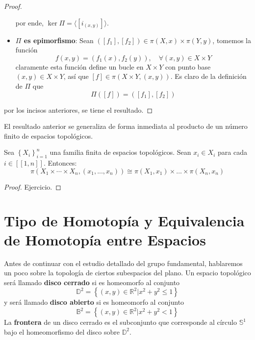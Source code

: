 \documentclass[12pt]{report}
\theoremstyle{largebreak}
\newcommand\natint[1]{\ensuremath{\left[\!\left[ #1\right]\!\right]}}
\begin{document}
\begin{proof}
\begin{itemize}
            por ende, $\ker\Pi=\langle[i_{(x,y)}]\rangle$.
            \item \textbf{$\Pi$ es epimorfismo}: Sean $([f_1],[f_2])\in\pi(X,x)\times\pi(Y,y)$, tomemos la función
            \begin{equation*}
                f(x,y)=(f_1(x),f_2(y)),\quad\forall (x,y)\in X\times Y
            \end{equation*}
            claramente esta función define un bucle en $X\times Y$ con punto base $(x,y)\in X\times Y$, así que $[f]\in\pi(X\times Y,(x,y))$. Es claro de la definición de $\Pi$ que
            \begin{equation*}
                \Pi([f])=([f_1],[f_2])
            \end{equation*}
        \end{itemize}
        por los incisos anteriores, se tiene el resultado.
    \end{proof}

    \begin{obs}
        El resultado anterior se generaliza de forma inmediata al producto de un número finito de espacios topológicos.
    \end{obs}

    \begin{theor}
        Sea $\left\{X_i \right\}_{ i=1}^n$ una familia finita de espacios topológicos. Sean $x_i\in X_i$ para cada $i\in\natint{1,n}$. Entonces:
        \begin{equation*}
            \pi(X_1\times\cdots\times X_n,(x_1,...,x_n))\cong\pi(X_1,x_1)\times\dots\times\pi(X_n,x_n)
        \end{equation*}
    \end{theor}

    \begin{proof}
        Ejercicio.
    \end{proof}

    \section{Tipo de Homotopía y Equivalencia de Homotopía entre Espacios}

    Antes de continuar con el estudio detallado del grupo fundamental, hablaremos un poco sobre la topología de ciertos subespacios del plano. Un espacio topológico será llamado \textbf{disco cerrado} si es homeomorfo al conjunto 
    \begin{equation*}
        \mathbb{D}^2=\left\{(x,y)\in\mathbb{R}^2\Big|x^2+y^2\leq1 \right\}
    \end{equation*}
    y será llamado \textbf{disco abierto} si es homeomorfo al conjunto
    \begin{equation*}
        \mathbb{B}^2=\left\{(x,y)\in\mathbb{R}^2\Big|x^2+y^2<1 \right\}
    \end{equation*}
    La \textbf{frontera} de un disco cerrado es el subconjunto que corresponde al círculo $\mathbb{S}^1$ bajo el homeomorfismo del disco sobre $\mathbb{D}^2$.
\end{document}
